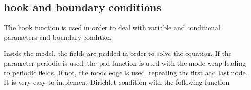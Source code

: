\documentclass[letterpaper,10pt,english]{sphinxmanual}
\begin{document}
\begin{sphinxVerbatim}[commandchars=\\\{\}]
     

   
          
           
          
       

 
  

\end{sphinxVerbatim}

\noindent{}


\subsection{hook and boundary conditions}
\label{\detokenize{overview:hook-and-boundary-conditions}}
The hook function is used in order to deal with variable and conditional parameters and boundary condition.

Inside the model, the fields are padded in order to solve the equation. If the parameter \sphinxquotedblleft{}periodic\sphinxquotedblright{} is used, the pad function is used with the mode \sphinxquotedblleft{}wrap\sphinxquotedblright{} leading to periodic fields. If not, the mode \sphinxquotedblleft{}edge\sphinxquotedblright{} is used, repeating the first and last node. It is very easy to implement Dirichlet condition with the following function:
\end{document}
